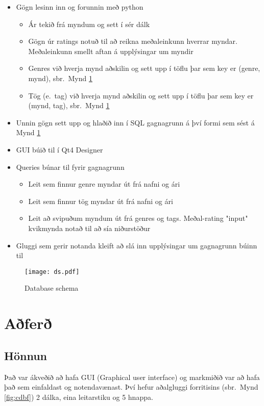 \documentclass[12pt, git, draft]{rureport}
\begin{document}
\begin{itemize}
	\item Gögn lesinn inn og forunnin með python
	\begin{itemize}
		\item Ár tekið frá myndum og sett í sér dálk
		\item Gögn úr ratings notuð til að reikna meðaleinkunn hverrar myndar. Meðaleinkunn smellt aftan á upplýsingar um myndir
		\item Genres við hverja mynd aðskilin og sett upp í töflu þar sem key er (genre, mynd), sbr.~Mynd \ref{fig:dataschema}
		\item Tög (e.~tag) við hverja mynd aðskilin og sett upp í töflu þar sem key er (mynd, tag), sbr.~Mynd \ref{fig:dataschema}
	\end{itemize}
	\item Unnin gögn sett upp og hlaðið inn í SQL gagnagrunn á því formi sem sést á Mynd \ref{fig:dataschema}
	\item GUI búið til í Qt4 Designer \cite{qt4}
	\item Queries búnar til fyrir gagnagrunn
	\begin{itemize}
		\item Leit sem finnur genre myndar út frá nafni og ári
		\item Leit sem finnur tög myndar út frá nafni og ári
		\item Leit að svipuðum myndum út frá genres og tags. Meðal-rating "input" kvikmynda notað til að sía niðurstöður
	\end{itemize}
	\item Gluggi sem gerir notanda kleift að slá inn upplýsingar um gagnagrunn búinn til
\end{itemize}

\begin{figure}
	\centering 
	\texttt{[image: ds.pdf]}
	\caption{Database schema \label{fig:dataschema}}
\end{figure} 

\section{Aðferð}\label{nidurstodur}
\subsection{Hönnun}
Það var ákveðið að hafa GUI (Graphical user interface) og markmiðið var að hafa það sem einfaldast og notendavænast. Því hefur aðalgluggi forritisins (sbr.~Mynd \ref{fig:cdbf}) 2 dálka, eina leitarstiku og 5 hnappa.
\end{document}
